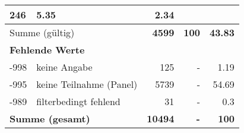 \begin{longtable}{lXrrr}
       \num{246} &
       \num[round-mode=places,round-precision=2]{5.35} &
         \num[round-mode=places,round-precision=2]{2.34} \\
     \midrule
     \multicolumn{2}{l}{Summe (gültig)} &
       \textbf{\num{4599}} &
     \textbf{\num{100}} &
       \textbf{\num[round-mode=places,round-precision=2]{43.83}} \\
     \multicolumn{5}{l}{\textbf{Fehlende Werte}}\\
       -998 &
       keine Angabe &
         \num{125} &
        - &
         \num[round-mode=places,round-precision=2]{1.19} \\
       -995 &
       keine Teilnahme (Panel) &
         \num{5739} &
        - &
         \num[round-mode=places,round-precision=2]{54.69} \\
       -989 &
       filterbedingt fehlend &
         \num{31} &
        - &
         \num[round-mode=places,round-precision=2]{0.3} \\
     \midrule
     \multicolumn{2}{l}{\textbf{Summe (gesamt)}} &
          \textbf{\num{10494}} &
        \textbf{-} &
        \textbf{\num{100}} \\
     \bottomrule
     \end{longtable}
     
